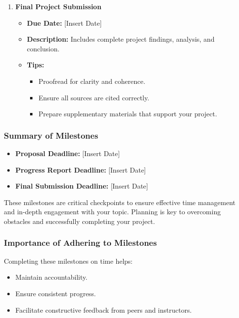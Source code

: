 \documentclass[aspectratio=169]{beamer}
\begin{document}
\begin{frame}[fragile]
\begin{enumerate}
        \item \textbf{Final Project Submission}
        \begin{itemize}
            \item \textbf{Due Date:} [Insert Date]
            \item \textbf{Description:} Includes complete project findings, analysis, and conclusion.
            \item \textbf{Tips:}
            \begin{itemize}
                \item Proofread for clarity and coherence.
                \item Ensure all sources are cited correctly.
                \item Prepare supplementary materials that support your project.
            \end{itemize}
        \end{itemize}
    \end{enumerate}
\end{frame}

\begin{frame}[fragile]
    \frametitle{Summary of Milestones}
    \begin{itemize}
        \item \textbf{Proposal Deadline:} [Insert Date]
        \item \textbf{Progress Report Deadline:} [Insert Date]
        \item \textbf{Final Submission Deadline:} [Insert Date]
    \end{itemize}

    These milestones are critical checkpoints to ensure effective time management and in-depth engagement with your topic. Planning is key to overcoming obstacles and successfully completing your project.
\end{frame}

\begin{frame}[fragile]
    \frametitle{Importance of Adhering to Milestones}
    Completing these milestones on time helps:
    \begin{itemize}
        \item Maintain accountability.
        \item Ensure consistent progress.
        \item Facilitate constructive feedback from peers and instructors.
    \end{itemize}
\end{frame}
\end{document}
